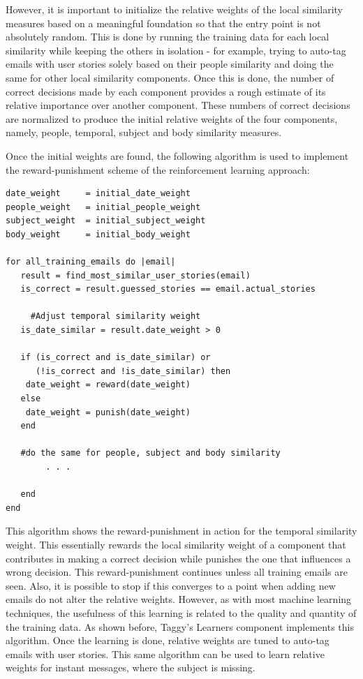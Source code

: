 However, it is important to initialize the relative weights of the local similarity measures based on a meaningful foundation so that the entry point is not absolutely random. This is done by running the training data for each local similarity while keeping the others in isolation - for example, trying to auto-tag emails with user stories solely based on their people similarity and doing the same for other local similarity components. Once this is done, the number of correct decisions made by each component provides a rough estimate of its relative importance over another component. These numbers of correct decisions are normalized to produce the initial relative weights of the four components, namely, people, temporal, subject and body similarity measures.

Once the initial weights are found, the following algorithm is used to implement the reward-punishment scheme of the reinforcement learning approach:

\pagebreak
\begin{verbatim}
date_weight     = initial_date_weight
people_weight   = initial_people_weight
subject_weight  = initial_subject_weight
body_weight     = initial_body_weight

for all_training_emails do |email|
   result = find_most_similar_user_stories(email)
   is_correct = result.guessed_stories == email.actual_stories

	 #Adjust temporal similarity weight
   is_date_similar = result.date_weight > 0

   if (is_correct and is_date_similar) or 
      (!is_correct and !is_date_similar) then
    date_weight = reward(date_weight)
   else
    date_weight = punish(date_weight)
   end

   #do the same for people, subject and body similarity
		. . .
		
   end
end
\end{verbatim}
This algorithm shows the reward-punishment in action for the temporal similarity weight. This essentially rewards the local similarity weight of a component that contributes in making a correct decision while punishes the one that influences a wrong decision. This reward-punishment continues unless all training emails are seen. Also, it is possible to stop if this converges to a point when adding new emails do not alter the relative weights. However, as with most machine learning techniques, the usefulness of this learning is related to the quality and quantity of the training data. As shown before, Taggy's Learners component implements this algorithm. Once the learning is done, relative weights are tuned to auto-tag emails with user stories. This same algorithm can be used to learn relative weights for instant messages, where the subject is missing.

